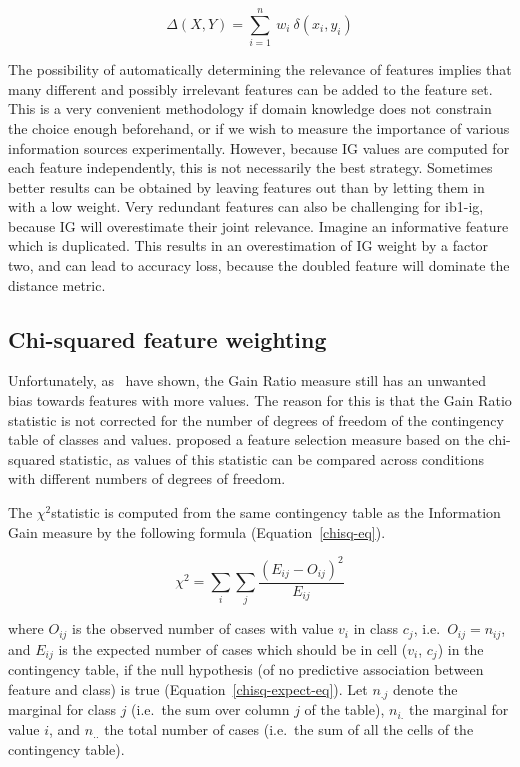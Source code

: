\documentclass{report}
\newcommand{\chisq}{{$ \chi^2 $}}
\begin{document}
\begin{equation}
\Delta(X,Y) = \sum_{i=1}^{n}\ w_{i} \ \delta(x_{i},y_{i})
\label{distancew}
\end{equation} 

The possibility of automatically determining the relevance of features
implies that many different and possibly irrelevant features can be
added to the feature set. This is a very convenient methodology if
domain knowledge does not constrain the choice enough beforehand, or
if we wish to measure the importance of various information sources
experimentally. However, because IG values are computed for each
feature independently, this is not necessarily the best
strategy. Sometimes better results can be obtained by leaving features
out than by letting them in with a low weight. Very redundant features
can also be challenging for {\sc ib1-ig}, because IG will overestimate
their joint relevance. Imagine an informative feature which is
duplicated. This results in an overestimation of IG weight by a factor
two, and can lead to accuracy loss, because the doubled feature will
dominate the distance metric.

\subsection{Chi-squared feature weighting}
\label{chisquared}

Unfortunately, as~ have shown, the Gain Ratio measure
still has an unwanted bias towards features with more values. The
reason for this is that the Gain Ratio statistic is not corrected for
the number of degrees of freedom of the contingency table of classes
and values.  proposed a feature selection measure based
on the chi-squared statistic, as values of this statistic can be
compared across conditions with different numbers of degrees of
freedom.

The \chisq statistic is computed from the same contingency table as
the Information Gain measure by the following formula
(Equation~\ref{chisq-eq}).

\begin{equation} 
\chi^{2} = \sum_{i} \sum_{j} \frac{(E_{ij} - O_{ij})^{2}}
				  {E_{ij}} 
\label{chisq-eq}
\end{equation} 

where $O_{ij}$ is the observed number of cases with value $v_{i}$ in
class $c_{j}$, i.e.~$O_{ij} = n_{ij}$, and $E_{ij}$ is the expected
number of cases which should be in cell ($v_{i}$, $c_{j}$) in the
contingency table, if the null hypothesis (of no predictive
association between feature and class) is true
(Equation~\ref{chisq-expect-eq}). Let $n_{.j}$ denote the marginal for
class $j$ (i.e.~the sum over column $j$ of the table), $n_{i.}$ the
marginal for value $i$, and $n_{..}$ the total number of cases
(i.e.~the sum of all the cells of the contingency table).
\end{document}
